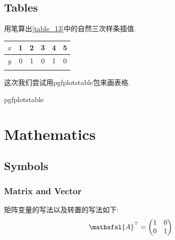 \documentclass[a4paper, 12pt]{ctexart}
\let\oldtable\table
\let\oldendtable\endtable
\renewenvironment{table}
    {\par\nolinenumbers\oldtable}
    {\oldendtable\endnolinenumbers\par}
\theoremstyle{plain}
\theoremstyle{plain}
\theoremstyle{plain}
\theoremstyle{nonumberplain}
\newcommand*{\matr}[1]{\ensuremath{\mathsfsl{#1}}} %
\begin{document}

    \subsection{Tables}

    用笔算出\ref{table_13}中的自然三次样条插值.
    \begin{table}[H]
        \begin{center}
            \caption{习题中给定的三次样条数据}
            \label{table_13}
            \begin{tabular}{cccccc}
                \Xhline{1.2pt}
                $x$ & 1 & 2 & 3 & 4 & 5\\
                \hline
                $y$ & 0 & 1 & 0 & 1 & 0\\
                \Xhline{1.2pt}
            \end{tabular}
        \end{center}
    \end{table}

    这次我们尝试用pgfplotstable包来画表格.
    \begin{table}[H]
        \begin{center}
            \caption{pgfplotstable}
        \end{center}
    \end{table}

    \section{Mathematics}

    \subsection{Symbols}

    \subsubsection{Matrix and Vector}

    矩阵变量的写法以及转置的写法如下:
    \begin{equation}
        \matr{A}^{\top} =
        \begin{pmatrix}
            1 & 0\\
            0 & 1
        \end{pmatrix}
    \end{equation}
\end{document}
